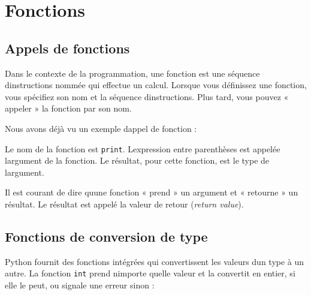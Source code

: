\hypertarget{fonctions}{%
\section{Fonctions}\label{fonctions}}

\hypertarget{appels-de-fonctions}{%
\subsection{Appels de fonctions}\label{appels-de-fonctions}}

Dans le contexte de la programmation, une fonction est une séquence
d\textquotesingle instructions nommée qui effectue un calcul. Lorsque
vous définissez une fonction, vous spécifiez son nom et la séquence
d\textquotesingle instructions. Plus tard, vous pouvez « appeler » la
fonction par son nom.

Nous avons déjà vu un exemple d\textquotesingle appel de fonction :

\begin{Shaded}
\begin{Highlighting}[]
\OperatorTok{\textgreater{}\textgreater{}\textgreater{}} \NormalTok{(}\NormalTok{)}
\end{Highlighting}
\end{Shaded}

Le nom de la fonction est \texttt{print}. L\textquotesingle expression
entre parenthèses est appelée l\textquotesingle argument de la fonction.
Le résultat, pour cette fonction, est le type de
l\textquotesingle argument.

Il est courant de dire qu\textquotesingle une fonction « prend » un
argument et « retourne » un résultat. Le résultat est appelé la valeur
de retour (\emph{return value}).

\hypertarget{fonctions-de-conversion-de-type}{%
\subsection{Fonctions de conversion de
type}\label{fonctions-de-conversion-de-type}}

Python fournit des fonctions intégrées qui convertissent les valeurs
d\textquotesingle un type à un autre. La fonction \texttt{int} prend
n\textquotesingle importe quelle valeur et la convertit en entier, si
elle le peut, ou signale une erreur sinon :

